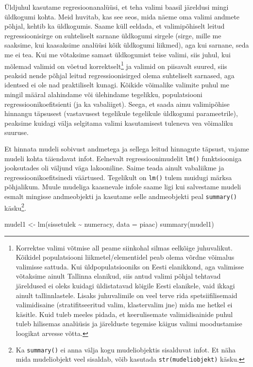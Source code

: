 \documentclass[
]{book}
\newenvironment{Shaded}{\begin{snugshade}}{\end{snugshade}}
\newcommand{\AttributeTok}[1]{\textcolor[rgb]{0.77,0.63,0.00}{#1}}
\newcommand{\FunctionTok}[1]{\textcolor[rgb]{0.00,0.00,0.00}{#1}}
\newcommand{\NormalTok}[1]{#1}
\newcommand{\OtherTok}[1]{\textcolor[rgb]{0.56,0.35,0.01}{#1}}
\newcommand{\SpecialCharTok}[1]{\textcolor[rgb]{0.00,0.00,0.00}{#1}}
\begin{document}
Üldjuhul kasutame regresioonanalüüsi, et teha valimi baasil järeldusi mingi üldkogumi kohta. Meid huvitab, kas see seos, mida näeme oma valimi andmete põhjal, kehtib ka üldkogumis. Saame küll eeldada, et valimipõhiselt leitud regressioonisirge on suhteliselt sarnane üldkogumi sirgele (sirge, mille me saaksime, kui kaasaksime analüüsi kõik üldkogumi liikmed), aga kui sarnane, seda me ei tea. Kui me võtaksime samast üldkogumist teise valimi, siis juhul, kui mõlemad valimid on võetud korrektselt\footnote{Korrektse valimi võtmise all peame siinkohal silmas eelkõige juhuvalikut. Kõikidel populatsiooni liikmetel/elementidel peab olema võrdne võimalus valimisse sattuda. Kui üldpopulatsiooniks on Eesti elanikkond, aga valimisse võtaksime ainult Tallinna elanikud, siis antud valimi põhjal tehtavad järeldused ei oleks kuidagi üldistatavad kõigile Eesti elanikele, vaid ikkagi ainult tallinnlastele. Lisaks juhuvalimile on veel terve rida spetsiifilisemaid valimidisaine (stratifitseeritud valim, klastervalim jne) mida me hetkel ei käsitle. Kuid tuleb meeles pidada, et keerulisemate valimidisainide puhul tuleb hilisemas analüüsis ja järelduste tegemise käigus valimi moodustamise loogikat arvesse võtta.} ja valimid on piisavalt suured, siis peaksid nende põhjal leitud regressioonisirged olema suhteliselt sarnased, aga identsed ei ole nad praktiliselt kunagi. Kõikide võimalike valimite puhul me mingil määral alahindame või ülehindame tegelikku, populatsiooni regressioonikoefitsienti (ja ka vabaliiget). Seega, et saada aimu valimipõhise hinnangu täpsusest (vastavusest tegelikule tegelikule üldkogumi parameetrile), peaksime kuidagi välja selgitama valimi kasutamisest tuleneva vea võimaliku suuruse.

Et hinnata mudeli sobivust andmetega ja sellega leitud hinnagute täpsust, vajame mudeli kohta täiendavat infot. Eelnevalt regressioonimudelit \texttt{lm()} funktsiooniga jooksutades oli väljund väga lakooniline. Saime teada ainult vabaliikme ja regressioonikoefitsinedi väärtused. Tegelikult on \texttt{lm()} tulem muidugi märksa põhjalikum. Muule mudeliga kaasnevale infole saame ligi kui salvestame mudeli esmalt mingisse andmeobjekti ja kasutame selle andmeobjekti peal \texttt{summary()} käsku\footnote{Ka \texttt{summary()} ei anna välja kogu mudeliobjektis sisalduvat infot. Et näha mida mudeliobjekt veel sisaldab, võib kasutada \texttt{str(mudeliobjekt)} käsku.}.

\begin{Shaded}
\begin{Highlighting}[]
\NormalTok{mudel1 }\OtherTok{\textless{}{-}} \FunctionTok{lm}\NormalTok{(sissetulek }\SpecialCharTok{\textasciitilde{}}\NormalTok{ numeracy, }\AttributeTok{data =}\NormalTok{ piaac)}
\FunctionTok{summary}\NormalTok{(mudel1)}
\end{Highlighting}
\end{Shaded}
\end{document}
